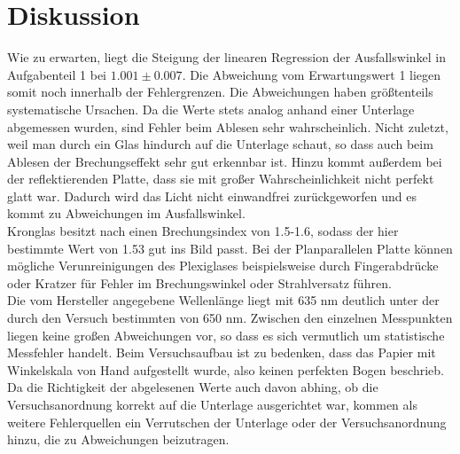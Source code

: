 \section{Diskussion}
\label{sec:Diskussion}

Wie zu erwarten, liegt die Steigung der linearen Regression der Ausfallswinkel in Aufgabenteil 1 bei 
$1.001 \pm 0.007$. Die Abweichung vom Erwartungswert 1 liegen somit noch innerhalb der Fehlergrenzen.
Die Abweichungen haben größtenteils systematische Ursachen. Da die Werte stets analog 
anhand einer Unterlage abgemessen wurden, sind Fehler beim Ablesen sehr wahrscheinlich.
Nicht zuletzt, weil man durch ein Glas hindurch auf die Unterlage schaut, so dass auch beim Ablesen
der Brechungseffekt sehr gut erkennbar ist. Hinzu kommt außerdem bei der reflektierenden 
Platte, dass sie mit großer Wahrscheinlichkeit nicht perfekt glatt war. Dadurch wird das 
Licht nicht einwandfrei zurückgeworfen und es kommt zu Abweichungen im Ausfallswinkel. \\
 
Kronglas besitzt nach \cite{brechind} einen Brechungsindex von 1.5-1.6, sodass der hier bestimmte Wert von 
1.53 gut ins Bild passt. Bei der Planparallelen Platte können mögliche Verunreinigungen des 
Plexiglases beispielsweise durch Fingerabdrücke oder Kratzer für Fehler im Brechungswinkel oder 
Strahlversatz führen. \\

Die vom Hersteller angegebene Wellenlänge liegt mit 635 nm deutlich unter der durch den Versuch 
bestimmten von 650 nm. Zwischen den einzelnen Messpunkten liegen keine großen Abweichungen 
vor, so dass es sich vermutlich um statistische Messfehler handelt. Beim Versuchsaufbau ist 
zu bedenken, dass das Papier mit Winkelskala von Hand aufgestellt wurde, also keinen perfekten 
Bogen beschrieb. Da die Richtigkeit der abgelesenen Werte auch davon abhing, ob die Versuchsanordnung
korrekt auf die Unterlage ausgerichtet war, kommen als weitere Fehlerquellen ein Verrutschen
der Unterlage oder der Versuchsanordnung hinzu, die zu Abweichungen beizutragen.\\
